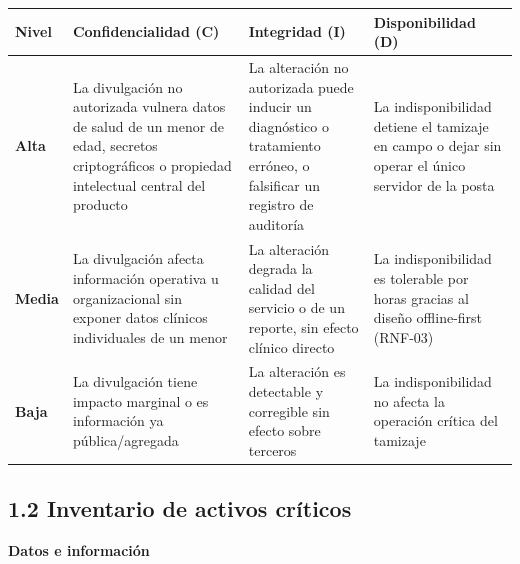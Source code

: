 \documentclass[11pt,a4paper]{article}
\begin{document}
{\small
\begin{longtable}[]{@{}
  >{\raggedright\arraybackslash}p{}
  >{\raggedright\arraybackslash}p{}
  >{\raggedright\arraybackslash}p{}
  >{\raggedright\arraybackslash}p{}@{}}
\toprule\noalign{}
\begin{minipage}[b]{\linewidth}\raggedright
Nivel
\end{minipage} & \begin{minipage}[b]{\linewidth}\raggedright
Confidencialidad (C)
\end{minipage} & \begin{minipage}[b]{\linewidth}\raggedright
Integridad (I)
\end{minipage} & \begin{minipage}[b]{\linewidth}\raggedright
Disponibilidad (D)
\end{minipage} \\
\midrule\noalign{}
\endhead
\bottomrule\noalign{}
\endlastfoot
\textbf{Alta} & La divulgación no autorizada vulnera datos de salud de un menor de edad, secretos criptográficos o propiedad intelectual central del producto & La alteración no autorizada puede inducir un diagnóstico o tratamiento erróneo, o falsificar un registro de auditoría & La indisponibilidad detiene el tamizaje en campo o dejar sin operar el único servidor de la posta \\
\textbf{Media} & La divulgación afecta información operativa u organizacional sin exponer datos clínicos individuales de un menor & La alteración degrada la calidad del servicio o de un reporte, sin efecto clínico directo & La indisponibilidad es tolerable por horas gracias al diseño offline-first (RNF-03) \\
\textbf{Baja} & La divulgación tiene impacto marginal o es información ya pública/agregada & La alteración es detectable y corregible sin efecto sobre terceros & La indisponibilidad no afecta la operación crítica del tamizaje \\
\end{longtable}
}

\subsection{1.2 Inventario de activos críticos}\label{inventario-de-activos-cruxedticos}

\textbf{Datos e información}
\end{document}
